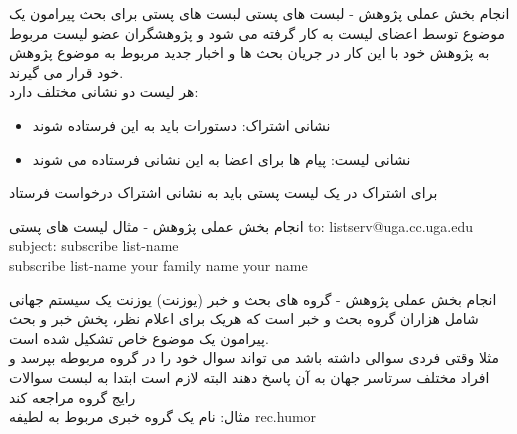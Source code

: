 \documentclass[14pt]{beamer}
\makeatletter
\newcommand{\rtlist}{\raggedleft\rightskip\@totalleftmargin}
\newcommand{\framefontsizelarge}{\fontsize{18pt}{0pt}\selectfont}
\newcommand{\frametitlefontsize}{\fontsize{20pt}{0pt}\selectfont}
\newcommand{\defaultvspace}{\vspace{5mm}}
\makeatother
\begin{document}
\begin{persian}
	\begin{frame}{\frametitlefontsize  انجام بخش عملی پژوهش - لبست های پستی }
		\framefontsizelarge
		لبست های پستی برای بحث پیرامون یک موضوع توسط اعضای لیست به کار گرفته می شود و پژوهشگران عضو لیست مربوط به پژوهش خود با این کار در جریان بحث ها و اخبار جدید مربوط به موضوع پژوهش خود قرار می گیرند.\defaultvspace\\
		هر لیست دو نشانی مختلف دارد: 
		\begin{itemize}\rtlist
			\item نشانی اشتراک: دستورات باید به این فرستاده شوند
			\item نشانی لیست: پیام ها برای اعضا به این نشانی فرستاده می شوند
		\end{itemize}
		\persian
		برای اشتراک در یک لیست پستی باید به نشانی اشتراک درخواست فرستاد
	\end{frame}
	
	\begin{frame}{\frametitlefontsize  انجام بخش عملی پژوهش - مثال لیست های پستی }
		\framefontsizelarge
		\latin
		to: listserv@uga.cc.uga.edu\\
		subject: subscribe list-name\\
		subscribe list-name your family name your name\\
	\end{frame}
	
	\begin{frame}{\frametitlefontsize  انجام بخش عملی پژوهش - گروه های بحث و خبر (یوزنت) }
		\framefontsizelarge
		یوزنت یک سیستم جهانی شامل هزاران گروه بحث و خبر است که هریک برای اعلام نظر، پخش خبر و بحث پیرامون یک موضوع خاص تشکیل شده است. \defaultvspace\\
		مثلا وقتی فردی سوالی داشته باشد می تواند سوال خود را در گروه مربوطه بپرسد و افراد مختلف سرتاسر جهان به آن پاسخ دهند البته لازم است ابتدا به لبست سوالات رایج گروه مراجعه کند\\
		مثال: نام یک گروه خبری مربوط به لطیفه rec.humor
	\end{frame}


\end{persian}
\end{document}
